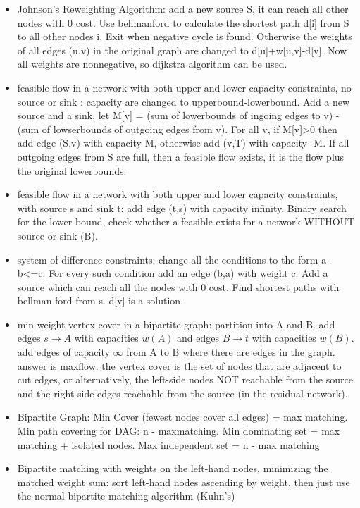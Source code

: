 \documentclass[landscape,a4paper,twocolumn,10pt]{report}
\begin{document}
\begin{itemize}
\item Johnson's Reweighting Algorithm: add a new source S, it can reach all other nodes with 0 cost. Use bellmanford to calculate the shortest path d[i] from S to all other nodes i. Exit when negative cycle is found. Otherwise the weights of all edges (u,v) in the original graph are changed to d[u]+w[u,v]-d[v]. Now all weights are nonnegative, so dijkstra algorithm can be used.
\item feasible flow in a network with both upper and lower capacity constraints, no source or sink : capacity are changed to upperbound-lowerbound. Add a new source and a sink. let M[v] = (sum of lowerbounds of ingoing edges to v) - (sum of lowserbounds of outgoing edges from v). For all v, if M[v]>0 then add edge (S,v) with capacity M, otherwise add (v,T) with capacity -M. If all outgoing edges from S are full, then a feasible flow exists, it is the flow plus the original lowerbounds.
\item feasible flow in a network with both upper and lower capacity constraints, with source s and sink t: add edge (t,s) with capacity infinity. Binary search for the lower bound, check whether a feasible exists for a network WITHOUT source or sink (B).
\item system of difference constraints: change all the conditions to the form a-b<=c. For every such condition add an edge (b,a) with weight c. Add a source which can reach all the nodes with 0 cost. Find shortest paths with bellman ford from s. d[v] is a solution.
\item min-weight vertex cover in a bipartite graph: partition into A and B. add edges $s \rightarrow A$ with capacities $w(A)$ and edges $B \rightarrow t$ with capacities $w(B)$. add edges of capacity $\infty$ from A to B where there are edges in the graph. answer is maxflow. the vertex cover is the set of nodes that are
adjacent to cut edges, or alternatively, the left-side nodes NOT reachable from the source and the right-side edges reachable from the source (in the residual network).
\item Bipartite Graph: Min Cover (fewest nodes cover all edges) = max matching. Min path covering for DAG: n - maxmatching. Min dominating set = max matching + isolated nodes. Max independent set = n - max matching
\item Bipartite matching with weights on the left-hand nodes, minimizing the matched weight sum:
   sort left-hand nodes ascending by weight, then just use the normal bipartite matching algorithm (Kuhn's)

\end{itemize}
\end{document}
